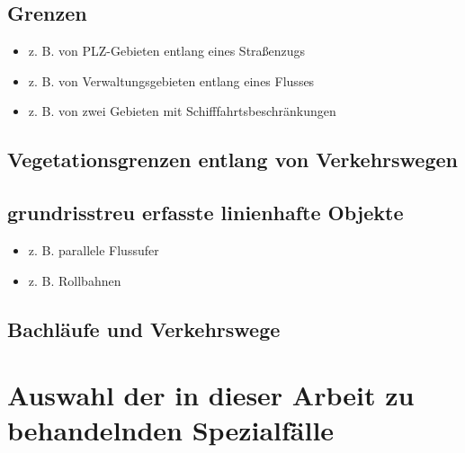 \documentclass[../main/thesis.tex]{subfiles}
\begin{document}
\subsection{Grenzen}
\begin{itemize}
	\item z. B. von PLZ-Gebieten entlang eines Straßenzugs
	\item z. B. von Verwaltungsgebieten entlang eines Flusses
	\item z. B. von zwei Gebieten mit Schifffahrtsbeschränkungen
\end{itemize}


\subsection{Vegetationsgrenzen entlang von Verkehrswegen}


\subsection{grundrisstreu erfasste linienhafte Objekte}
\begin{itemize}
	\item z. B. parallele Flussufer
	\item z. B. Rollbahnen
\end{itemize}


\subsection{Bachläufe und Verkehrswege}






\section{Auswahl der in dieser Arbeit zu behandelnden Spezialfälle}
\end{document}
